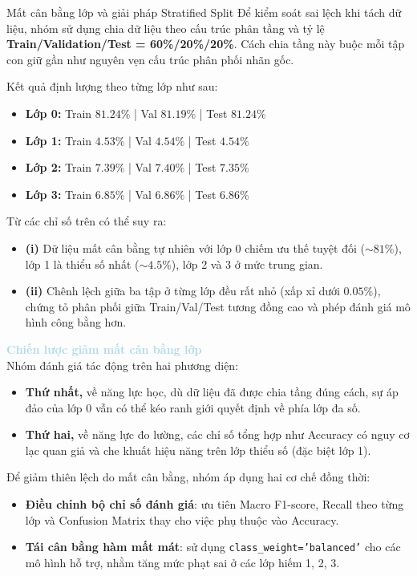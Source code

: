 \begin{warningbox}{Mất cân bằng lớp và giải pháp Stratified Split}
Để kiểm soát sai lệch khi tách dữ liệu, nhóm sử dụng chia dữ liệu theo cấu trúc phân tầng và tỷ lệ \textbf{Train/Validation/Test = 60\%/20\%/20\%}. Cách chia tầng này buộc mỗi tập con giữ gần như nguyên vẹn cấu trúc phân phối nhãn gốc.

Kết quả định lượng theo từng lớp như sau:
\begin{itemize}
    \item \textbf{Lớp 0:} Train $81.24\%$ \;|\; Val $81.19\%$ \;|\; Test $81.24\%$
    \item \textbf{Lớp 1:} Train $4.53\%$ \;|\; Val $4.54\%$ \;|\; Test $4.54\%$
    \item \textbf{Lớp 2:} Train $7.39\%$ \;|\; Val $7.40\%$ \;|\; Test $7.35\%$
    \item \textbf{Lớp 3:} Train $6.85\%$ \;|\; Val $6.86\%$ \;|\; Test $6.86\%$
\end{itemize}

Từ các chỉ số trên có thể suy ra:
\begin{itemize}
    \item \textbf{(i)} Dữ liệu mất cân bằng tự nhiên với lớp 0 chiếm ưu thế tuyệt đối ($\sim81\%$), lớp 1 là thiểu số nhất ($\sim4.5\%$), lớp 2 và 3 ở mức trung gian.
    \item \textbf{(ii)} Chênh lệch giữa ba tập ở từng lớp đều rất nhỏ (xấp xỉ dưới $0.05\%$), chứng tỏ phân phối giữa Train/Val/Test tương đồng cao và phép đánh giá mô hình công bằng hơn.
\end{itemize}
\end{warningbox}

\vspace{0.5em}
\noindent\textcolor{lightblue}{\textbf{Chiến lược giảm mất cân bằng lớp}}
\\
Nhóm đánh giá tác động trên hai phương diện:
\begin{itemize}
    \item \textbf{Thứ nhất,} về năng lực học, dù dữ liệu đã được chia tầng đúng cách, sự áp đảo của lớp 0 vẫn có thể kéo ranh giới quyết định về phía lớp đa số.
    \item \textbf{Thứ hai,} về năng lực đo lường, các chỉ số tổng hợp như Accuracy có nguy cơ lạc quan giả và che khuất hiệu năng trên lớp thiểu số (đặc biệt lớp 1).
\end{itemize}

Để giảm thiên lệch do mất cân bằng, nhóm áp dụng hai cơ chế đồng thời:
\begin{itemize}
    \item \textbf{Điều chỉnh bộ chỉ số đánh giá}: ưu tiên Macro F1-score, Recall theo từng lớp và Confusion Matrix thay cho việc phụ thuộc vào Accuracy.
    \item \textbf{Tái cân bằng hàm mất mát}: sử dụng \texttt{class\_weight='balanced'} cho các mô hình hỗ trợ, nhằm tăng mức phạt sai ở các lớp hiếm 1, 2, 3.
\end{itemize}

